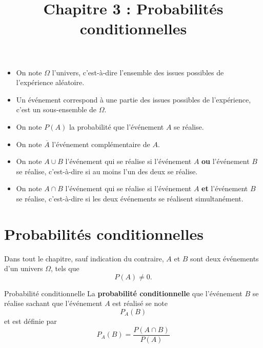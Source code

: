 \documentclass[11pt]{article}
\title{Chapitre 3 : Probabilités conditionnelles}
\date{}
\author{}
\begin{document}
\maketitle\thispagestyle{fancy}

\begin{notation}
  \begin{itemize}
    \item On note $\Omega$ l'univers, c'est-à-dire l'ensemble des issues
      possibles de l'expérience aléatoire.
    \item Un événement correspond à une partie des issues possibles de
      l'expérience, c'est un sous-ensemble de $\Omega$.
    \item On note $P(A)$ la probabilité que l'événement $A$ se réalise.
    \item On note $\overline A$ l'événement complémentaire de $A$.
    \item On note $A\cup B$ l'événement qui se réalise si l'événement $A$
      \textbf{ou} l'événement $B$ se réalise, c'est-à-dire si au moins l'un des
      deux se réalise.
    \item On note $A\cap B$ l'événement qui se réalise si l'événement $A$
      \textbf{et} l'événement $B$ se réalise, c'est-à-dire si les deux
      événements se réalisent simultanément.
  \end{itemize}
\end{notation}

\section{Probabilités conditionnelles}

Dans tout le chapitre, sauf indication du contraire, $A$ et $B$ sont deux
événements d'un univers $\Omega$, tels que
\[
  P(A)\neq0.
\]

\begin{defi}{Probabilité conditionnelle}
  La \textbf{probabilité conditionnelle} que l'événement $B$ se réalise sachant
  que l'événement $A$ est réalisé se note
  \[
    P_A(B)
  \]
  et est définie par
  \[
    P_A(B) = \frac{P(A\cap B)}{P(A)}
  \]
\end{defi}
\end{document}
